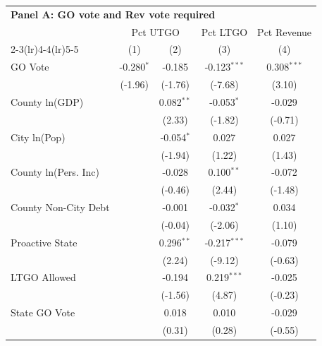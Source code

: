 \begingroup
\centering
\begin{tabular*}{\textwidth}{@{\extracolsep{\fill}}lcccc}
\multicolumn{5}{l}{\textbf{Panel A: GO vote and Rev vote required}}\\

\addlinespace
   \toprule
    & \multicolumn{2}{c}{Pct UTGO} & Pct LTGO & Pct Revenue\\
   \cmidrule(lr){2-3}\cmidrule(lr){4-4}\cmidrule(lr){5-5}
                               & (1)          & (2)           & (3)            & (4)\\  
   \midrule 
   GO Vote                     & -0.280$^{*}$ & -0.185        & -0.123$^{***}$ & 0.308$^{***}$\\   
                               & (-1.96)     & (-1.76)      & (-7.68)       & (3.10)\\   
   County ln(GDP)              &              & 0.082$^{**}$  & -0.053$^{*}$   & -0.029\\   
                               &              & (2.33)       & (-1.82)       & (-0.71)\\   
   City ln(Pop)                &              & -0.054$^{*}$  & 0.027          & 0.027\\   
                               &              & (-1.94)      & (1.22)        & (1.43)\\   
   County ln(Pers. Inc)        &              & -0.028        & 0.100$^{**}$   & -0.072\\   
                               &              & (-0.46)      & (2.44)        & (-1.48)\\   
   County Non-City Debt        &              & -0.001        & -0.032$^{*}$   & 0.034\\   
                               &              & (-0.04)      & (-2.06)       & (1.10)\\   
   Proactive State             &              & 0.296$^{**}$  & -0.217$^{***}$ & -0.079\\   
                               &              & (2.24)       & (-9.12)       & (-0.63)\\   
   LTGO Allowed                &              & -0.194        & 0.219$^{***}$  & -0.025\\   
                               &              & (-1.56)      & (4.87)        & (-0.23)\\   
   State GO Vote               &              & 0.018         & 0.010          & -0.029\\   
                               &              & (0.31)       & (0.28)        & (-0.55)\\   

\end{tabular*}

